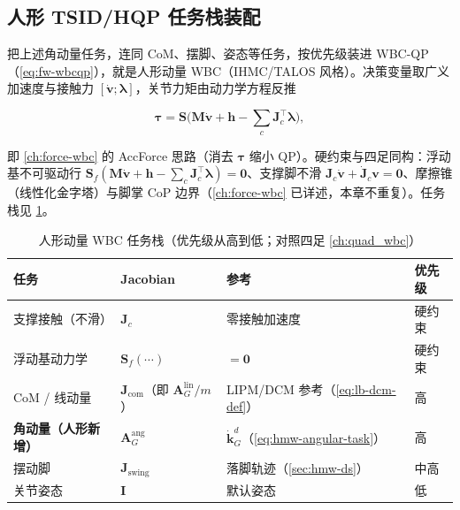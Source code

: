\subsection{人形 TSID/HQP 任务栈装配}
\label{subsec:hmw-task-stack}

把上述角动量任务，连同 CoM、摆脚、姿态等任务，按优先级装进 WBC-QP（\cref{eq:fw-wbcqp}），就是人形动量 WBC（IHMC/TALOS 风格）。决策变量取广义加速度与接触力 $[\dot{\mathbf v};\boldsymbol\lambda]$，关节力矩由动力学方程反推

\begin{equation}
  \boldsymbol\tau=\mathbf S\big(\mathbf M\dot{\mathbf v}+\mathbf h-\textstyle\sum_c\mathbf J_c^\top\boldsymbol\lambda\big),
  \label{eq:hmw-torque-recover}
\end{equation}

即 \cref{ch:force-wbc} 的 AccForce 思路（消去 $\boldsymbol\tau$ 缩小 QP）。硬约束与四足同构：浮动基不可驱动行 $\mathbf S_f(\mathbf M\dot{\mathbf v}+\mathbf h-\sum_c\mathbf J_c^\top\boldsymbol\lambda)=\mathbf 0$、支撑脚不滑 $\mathbf J_c\dot{\mathbf v}+\dot{\mathbf J}_c\mathbf v=\mathbf 0$、摩擦锥（线性化金字塔）与脚掌 CoP 边界（\cref{ch:force-wbc} 已详述，本章不重复）。任务栈见 \cref{tab:hmw-task-stack}。

\begin{table}[H]\centering\small
\caption{人形动量 WBC 任务栈（优先级从高到低；对照四足 \cref{ch:quad_wbc}）}
\begin{tabular}{p{} p{} p{} p{}}
\toprule
任务 & Jacobian & 参考 & 优先级 \\
\midrule
支撑接触（不滑） & $\mathbf J_c$ & 零接触加速度 & 硬约束 \\
浮动基动力学 & $\mathbf S_f(\cdots)$ & $=\mathbf 0$ & 硬约束 \\
CoM / 线动量 & $\mathbf J_{\mathrm{com}}$（即 $\mathbf A_G^{\mathrm{lin}}/m$） & LIPM/DCM 参考（\cref{eq:lb-dcm-def}） & 高 \\
\textbf{角动量（人形新增）} & $\boldsymbol{A}_G^{\mathrm{ang}}$ & $\dot{\mathbf k}_G^d$（\cref{eq:hmw-angular-task}） & 高 \\
摆动脚 & $\mathbf J_{\mathrm{swing}}$ & 落脚轨迹（\cref{sec:hmw-ds}） & 中高 \\
关节姿态 & $\mathbf I$ & 默认姿态 & 低 \\
\bottomrule
\end{tabular}
\label{tab:hmw-task-stack}
\end{table}

